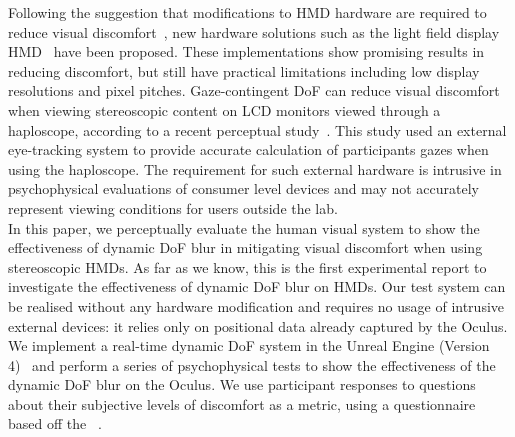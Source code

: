 Following the suggestion that modifications to HMD hardware are required to reduce visual discomfort~\cite{moss08}, new hardware solutions such as the light field display HMD~\cite{lanman13} have been proposed. These implementations show promising results in reducing discomfort, but still have practical limitations including low display resolutions and pixel pitches. Gaze-contingent DoF can reduce visual discomfort when viewing stereoscopic content on LCD monitors viewed through a haploscope, according to a recent perceptual study~\cite{duchowski14}. This study used an external eye-tracking system to provide accurate calculation of participants gazes when using the haploscope. The requirement for such external hardware is intrusive in psychophysical evaluations of consumer level devices and may not accurately represent viewing conditions for users outside the lab. \\


In this paper, we perceptually evaluate the human visual system to show the effectiveness of dynamic DoF blur in mitigating visual discomfort when using stereoscopic HMDs. As far as we know, this is the first experimental report to investigate the effectiveness of dynamic DoF blur on HMDs. Our test system can be realised without any hardware modification and requires no usage of intrusive external devices: it relies only on positional data already captured by the Oculus. We implement a real-time dynamic DoF system in the Unreal Engine (Version 4)~\cite{unreal} and perform a series of psychophysical tests to show the effectiveness of the dynamic DoF blur on the Oculus. We use participant responses to questions about their subjective levels of discomfort as a metric, using a questionnaire based off the ~\cite{kennedy93}. \\

